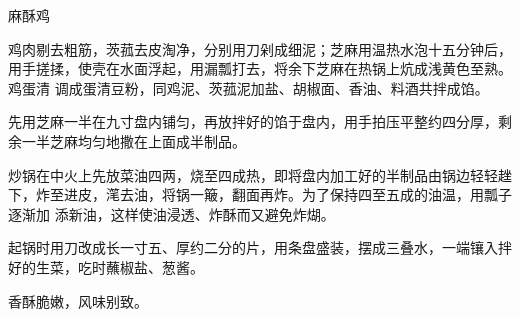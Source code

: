 %
%
%
%
%
%
%
\begin{recipe}{麻酥鸡}

\ingredients


\preparation

\step 鸡肉剔去粗筋，茨菰去皮淘净，分别用刀剁成细泥；芝麻用温热水泡十五分钟后，
用手搓揉，使壳在水面浮起，用漏瓢打去，将余下芝麻在热锅上炕成浅黄色至熟。鸡蛋清
调成蛋清豆粉，同鸡泥、茨菰泥加盐、胡椒面、香油、料酒共拌成馅。

\step 先用芝麻一半在九寸盘内铺匀，再放拌好的馅于盘内，用手拍压平整约四分厚，剩
余一半芝麻均匀地撒在上面成半制品。

\step 炒锅在中火上先放菜油四两，烧至四成热，即将盘内加工好的半制品由锅边轻轻趖
下，炸至进皮，滗去油，将锅一簸，翻面再炸。为了保持四至五成的油温，用瓢子逐渐加
添新油，这样使油浸透、炸酥而又避免炸煳。

\step 起锅时用刀改成长一寸五、厚约二分的片，用条盘盛装，摆成三叠水，一端镶入拌
好的生菜，吃时蘸椒盐、葱酱。

\features

香酥脆嫩，风味别致。

\end{recipe}


